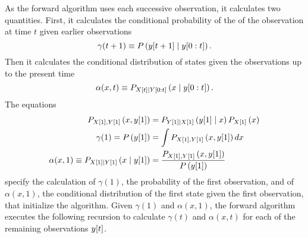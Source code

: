 As the forward algorithm uses each successive observation, it
calculates two quantities.  First, it calculates the conditional
probability of the of the observation at time $t$ given earlier
observations
\begin{equation*}
  \gamma(t+1) \equiv P\left({y}{[t+1]}\mid y[0:t] \right).
\end{equation*}
Then it calculates the conditional distribution of states given the
observations up to the present time
\begin{equation*}
  \alpha(x,t) \equiv P_{{X}{[t]}\mid Y[0:t]} \left(x\mid y[0:t]
  \right).
\end{equation*}
The equations
\begin{align}
  \label{eq:ContInitial}
  P_{{X}{[1]},{Y}{[1]}} \left(x,{y}{[1]} \right) &=
  P_{{Y}{[1]}\mid {X}{[1]}} \left({y}{[1]}\mid x \right)P_{{X}{[1]}}
  \left(x \right) \\
  \gamma(1) = P\left({y}{[1]} \right) & = \int
  P_{{X}{[1]},{Y}{[1]}}
  \left(x,{y}{[1]} \right) dx \\
  \alpha(x,1) \equiv P_{{X}{[1]}\mid {Y}{[1]}} \left(x\mid {y}{[1]} \right) &=
  \frac{P_{{X}{[1]},{Y}{[1]}} \left(x,{y}{[1]}
    \right)}{P\left({y}{[1]} \right)}
\end{align}
specify the calculation of $\gamma(1)$, the probability of the first
observation, and of $\alpha(x,1)$, the conditional distribution of the
first state given the first observation, that initialize the
algorithm.  Given $\gamma(1)$ and $\alpha(x,1)$, the forward algorithm
executes the following recursion to calculate $\gamma(t)$ and
$\alpha(x,t)$ for each of the remaining observations ${y}{[t]}$.
